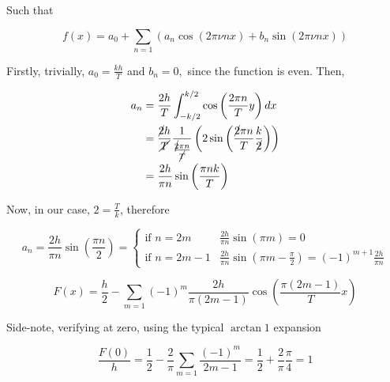 \documentclass[../main/main.tex]{subfiles}
\begin{document}
Such that

\begin{equation*}
	f(x) = a_{0} + \sum_{n=1}\left(a_{n} \cos ( 2\pi \nu n x) + b_{n} \sin( 2\pi \nu n x)\right)
\end{equation*}


Firstly, trivially, $a_{0}=\frac{kh}{T}$ and $b_{n} = 0,$ since the function is even.
Then,

\begin{align*}
	a_{n} & = \frac{2h}{T} \fourier[-k/2][k/2]{ \cos\left(\frac{2\pi n}{T} y\right)}                                                                                     \\
	      & = \frac{\cancel{2}h}{\cancel{T}}\frac{1}{\frac{\cancel{2}\pi n}{\cancel{T}}}\left( 2\sin\left(\frac{\cancel{2}\pi n}{T} \frac{k}{\cancel{2}}\right)  \right) \\
	      & = \frac{2h}{\pi n} \sin\left(\frac{\pi n k}{T} \right)
\end{align*}

Now, in our case, $2 = \frac T k$, therefore

\begin{equation*}
	a_{n} = \frac{2h}{\pi n} \sin\left(\frac{\pi n }{2} \right) =
	\begin{cases}
		\textrm{if $n=2m$ }  & \frac{2h}{\pi n} \sin\left(\pi m  \right) = 0                                       \\
		\textrm{if $n=2m-1$} & \frac{2h}{\pi n} \sin\left(\pi m - \frac \pi 2\right) = (-1)^{m+1}\frac{2h }{\pi n}
	\end{cases}
\end{equation*}

\begin{equation*}
	\boxed{
		F(x) = \frac{h}{2} -
		\sum_{m=1}(-1)^{m}\frac{2h }{\pi (2m-1)}
		\cos\left(\frac{\pi (2m -1)}{T} x \right)
	}
\end{equation*}

Side-note, verifying at zero, using the typical $\arctan 1$ expansion

\begin{equation*}
	\frac{F(0)}{h}
	= \frac{1}{2} - \frac 2 \pi \sum_{m=1}\frac{(-1)^{m}}{2m-1}
	= \frac{1}{2} + \frac 2 \pi  \frac \pi 4
	= 1
\end{equation*}
\end{document}
